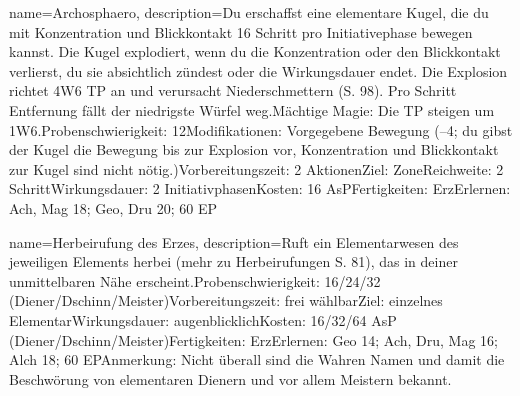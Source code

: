 {
    name={Archosphaero},
    description={Du erschaffst eine elementare Kugel, die du mit Konzentration und Blickkontakt 16 Schritt pro Initiativephase bewegen kannst. Die Kugel explodiert, wenn du die Konzentration oder den Blickkontakt verlierst, du sie absichtlich zündest oder die Wirkungsdauer endet. Die Explosion richtet 4W6 TP an und verursacht Niederschmettern (S. 98). Pro Schritt Entfernung fällt der niedrigste Würfel weg.\newline Mächtige Magie: Die TP steigen um 1W6.\newline Probenschwierigkeit: 12\newline Modifikationen: Vorgegebene Bewegung (–4; du gibst der Kugel die Bewegung bis zur Explosion vor, Konzentration und Blickkontakt zur Kugel sind nicht nötig.)\newline Vorbereitungszeit: 2 Aktionen\newline Ziel: Zone\newline Reichweite: 2 Schritt\newline Wirkungsdauer: 2 Initiativphasen\newline Kosten: 16 AsP\newline Fertigkeiten: Erz\newline Erlernen: Ach, Mag 18; Geo, Dru 20; 60 EP}
}


{
    name={Herbeirufung des Erzes},
    description={Ruft ein Elementarwesen des jeweiligen Elements herbei (mehr zu Herbeirufungen S. 81), das in deiner unmittelbaren Nähe erscheint.\newline Probenschwierigkeit: 16/24/32 (Diener/Dschinn/Meister)\newline Vorbereitungszeit: frei wählbar\newline Ziel: einzelnes Elementar\newline Wirkungsdauer: augenblicklich\newline Kosten: 16/32/64 AsP (Diener/Dschinn/Meister)\newline Fertigkeiten: Erz\newline Erlernen: Geo 14; Ach, Dru, Mag 16; Alch 18; 60 EP\newline Anmerkung: Nicht überall sind die Wahren Namen und damit die Beschwörung von elementaren Dienern und vor allem Meistern bekannt. }
}


